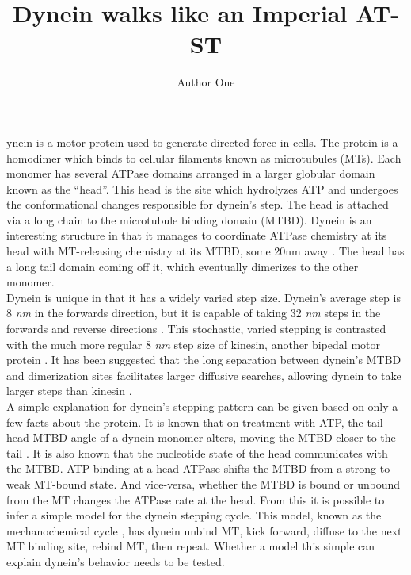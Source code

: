 \documentclass[9pt,twocolumn,twoside,lineno]{pnas-new}
\title{Dynein walks like an Imperial AT-ST}
\author[a,c,1]{Author One}
\affil[a]{Oregon State University}
\begin{document}
\verticaladjustment{-2pt}

\maketitle
\thispagestyle{firststyle}

ynein is a motor protein used to generate directed force in cells. The protein is a homodimer which binds to cellular filaments known as microtubules (MTs). Each monomer has several ATPase domains arranged in a larger globular domain known as the ``head''. This head is the site which hydrolyzes ATP and undergoes the conformational changes responsible for dynein's step. The head is attached via a long chain to the microtubule binding domain (MTBD). Dynein is an interesting structure in that it manages to coordinate ATPase chemistry at its head with MT-releasing chemistry at its MTBD, some 20nm away \cite{mt-atp-coupling}. The head has a long tail domain coming off it, which eventually dimerizes to the other monomer.\\

Dynein is unique in that it has a widely varied step size. Dynein's average step is 8 \textit{nm} in the forwards direction, but it is capable of taking 32 \textit{nm} steps in the forwards and reverse directions \cite{weihongpaper} \cite{yildizpaper}. This stochastic, varied stepping is contrasted with the much more regular 8 \textit{nm} step size of kinesin, another bipedal motor protein \cite{kinesin-step-size}. It has been suggested that the long separation between dynein's MTBD and dimerization sites facilitates larger diffusive searches, allowing dynein to take larger steps than kinesin \cite{cargotransport}.\\

A simple explanation for dynein's stepping pattern can be given based on only a few facts about the protein. It is known that on treatment with ATP, the tail-head-MTBD angle of a dynein monomer alters, moving the MTBD closer to the tail \cite{carteradpprimed} \cite{burgess-paper}. It is also known that the nucleotide state of the head communicates with the MTBD. ATP binding at a head ATPase shifts the MTBD from a strong to weak MT-bound state. And vice-versa, whether the MTBD is bound or unbound from the MT changes the ATPase rate at the head. From this it is possible to infer a simple model for the dynein stepping cycle. This model, known as the mechanochemical cycle \cite{cianfroccoreview}, has dynein unbind MT, kick forward, diffuse to the next MT binding site, rebind MT, then repeat. Whether a model this simple can explain dynein's behavior needs to be tested.\\
\end{document}
